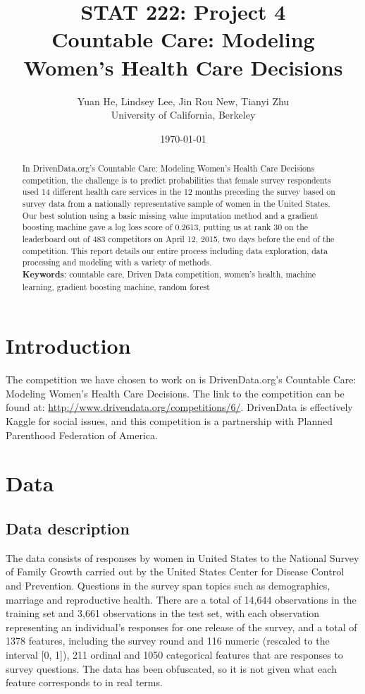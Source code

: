 \documentclass{article}\usepackage[]{graphicx}\usepackage[]{color}
\title{STAT 222: Project 4\\
       Countable Care: Modeling Women's Health Care Decisions}
\author{Yuan He, Lindsey Lee, Jin Rou New, Tianyi Zhu\\
        University of California, Berkeley}
\date{\today}
\begin{document}
\maketitle

\begin{abstract}
  In DrivenData.org's Countable Care: Modeling Women's Health Care Decisions competition, the challenge is to predict probabilities that female survey respondents used 14 different health care services in the 12 months preceding the survey based on survey data from a nationally representative sample of women in the United States. Our best solution using a basic missing value imputation method and a gradient boosting machine gave a log loss score of 0.2613, putting us at rank 30 on the leaderboard out of 483 competitors on April 12, 2015, two days before the end of the competition. This report details our entire process including data exploration, data processing and modeling with a variety of methods. \\ 
	\hfill\break
	\textbf{Keywords}: countable care, Driven Data competition, women's health, machine learning, gradient boosting machine, random forest
\end{abstract}
\clearpage
\section{Introduction}
\label{sec:introduction}
The competition we have chosen to work on is DrivenData.org's Countable Care: Modeling Women's Health Care Decisions. The link to the competition can be found at: \href{http://www.drivendata.org/competitions/6/}{http://www.drivendata.org/competitions/6/}. DrivenData is effectively Kaggle for social issues, and this competition is a partnership with Planned Parenthood Federation of America.
\section{Data}
\label{sec:data}

\subsection{Data description}
The data consists of responses by women in United States to the National Survey of Family Growth carried out by the United States Center for Disease Control and Prevention. Questions in the survey span topics such as demographics, marriage and reproductive health. There are a total of 14,644 observations in the training set and 3,661 observations in the test set, with each observation representing an individual’s responses for one release of the survey, and a total of 1378 features, including the survey round and 116 numeric (rescaled to the interval [0, 1]), 211 ordinal and 1050 categorical features that are responses to survey questions. The data has been obfuscated, so it is not given what each feature corresponds to in real terms.
\end{document}

